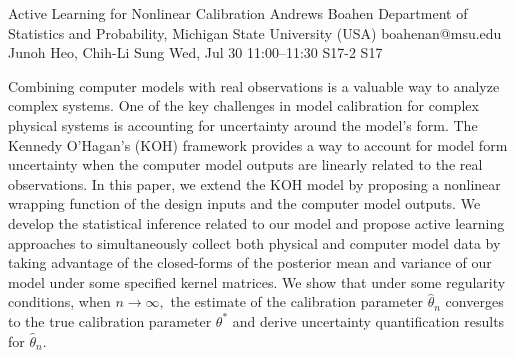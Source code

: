 \begin{talk}
  {Active Learning for Nonlinear Calibration}%
  {Andrews Boahen}%
  {Department of Statistics and Probability, Michigan State University (USA)}%
  {boahenan@msu.edu}%
  {Junoh Heo, Chih-Li Sung}%
  {}%
  {Wed, Jul 30 11:00--11:30}%
  {S17-2}%
  {S17}%
  
    
   
Combining computer models with real observations is a valuable way to analyze complex systems. One of the key challenges in model calibration for complex physical systems is accounting for uncertainty around the model's form. The Kennedy O'Hagan's (KOH) framework provides a way to account for model form uncertainty when the computer model outputs are linearly related to the real observations. In this paper, we extend the KOH model by proposing a nonlinear wrapping function of the design inputs and the computer model outputs. We develop the statistical inference related to our model and propose active learning approaches to simultaneously collect both physical and computer model data by taking advantage of the closed-forms of the posterior mean and variance of our model under some specified kernel matrices. We show that under some regularity conditions, when $n\rightarrow\infty,$ the estimate of the calibration parameter $\hat{\theta}_n$ converges  to  the true calibration parameter $\theta^*$ and derive uncertainty quantification results for $\hat{\theta}_n.$
\medskip


\end{talk}

